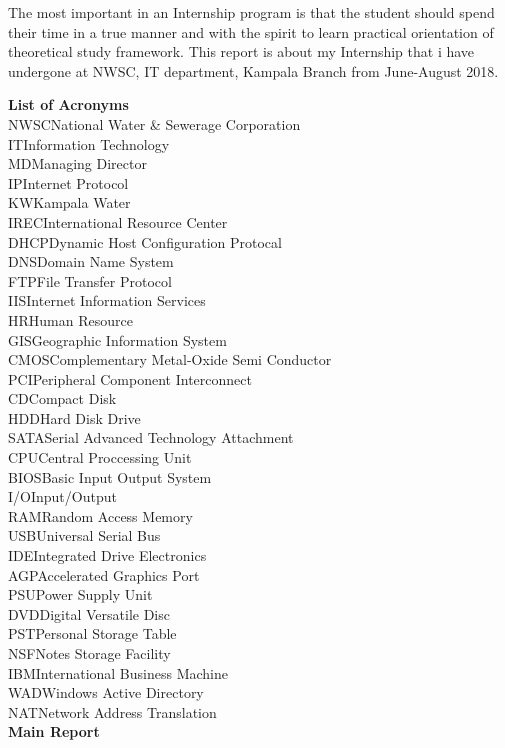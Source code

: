 \documentclass{article}
\begin{document}
\par The most important in an Internship program is that the student should spend their time in a true manner and with the spirit to learn practical orientation of theoretical study framework. This report is about my Internship that i have undergone at NWSC, IT department, Kampala Branch from June-August 2018.
\thispagestyle{empty}
\newpage
\thispagestyle{empty}
\tableofcontents
\thispagestyle{empty}
\cleardoublepage
\thispagestyle{empty}
\newpage
\listoffigures
\newpage
\listoftables
\thispagestyle{empty}
\newpage
\textbf{List of Acronyms}\\
NWSC\dotfill  National Water \& Sewerage Corporation\\
IT\dotfill Information Technology\\
MD\dotfill Managing Director\\
IP\dotfill Internet Protocol\\
KW\dotfill Kampala Water\\
IREC\dotfill International Resource Center\\
DHCP\dotfill Dynamic Host Configuration Protocal\\
DNS\dotfill Domain Name System\\
FTP\dotfill File Transfer Protocol\\
IIS\dotfill Internet Information Services\\
HR\dotfill Human Resource\\
GIS\dotfill Geographic Information System\\
CMOS\dotfill Complementary Metal-Oxide Semi Conductor\\
PCI\dotfill Peripheral Component Interconnect\\
CD\dotfill Compact Disk\\
HDD\dotfill Hard Disk Drive\\
SATA\dotfill Serial Advanced Technology Attachment\\
CPU\dotfill Central Proccessing Unit\\
BIOS\dotfill Basic Input Output System\\
I/O\dotfill Input/Output\\
RAM\dotfill Random Access Memory\\
USB\dotfill Universal Serial Bus\\
IDE\dotfill Integrated Drive Electronics\\
AGP\dotfill Accelerated Graphics Port\\
PSU\dotfill Power Supply Unit\\
DVD\dotfill Digital Versatile Disc\\
PST\dotfill Personal Storage Table\\
NSF\dotfill Notes Storage Facility\\
IBM\dotfill International Business Machine\\
WAD\dotfill Windows Active Directory\\
NAT\dotfill Network Address Translation\\
\thispagestyle{empty}
\newpage
\setcounter{page}{1}
\textbf{Main Report}\\
\end{document}
